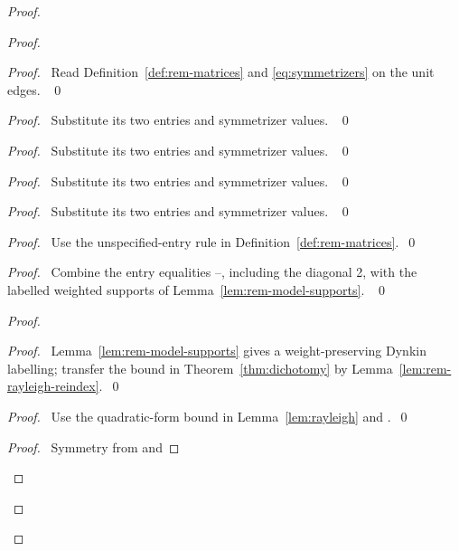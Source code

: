 \begin{proof}
\begin{proof}
\begin{proof}\pf\ Read Definition~\ref{def:rem-matrices} and
\eqref{eq:symmetrizers} on the unit edges. ~\qed\end{proof}
\begin{proof}\pf\ Substitute its two entries and symmetrizer values. ~\qed\end{proof}
\begin{proof}\pf\ Substitute its two entries and symmetrizer values. ~\qed\end{proof}
\begin{proof}\pf\ Substitute its two entries and symmetrizer values. ~\qed\end{proof}
\begin{proof}\pf\ Substitute its two entries and symmetrizer values. ~\qed\end{proof}
\begin{proof}\pf\ Use the unspecified-entry rule in
Definition~\ref{def:rem-matrices}.~\qed\end{proof}
\begin{proof}\pf\ Combine the entry equalities
--, including the diagonal 2,
with the labelled weighted supports of Lemma~\ref{lem:rem-model-supports}. ~\qed\end{proof}
\begin{proof}
\begin{proof}\pf\ Lemma~\ref{lem:rem-model-supports} gives a
weight-preserving Dynkin labelling; transfer the bound in
Theorem~\ref{thm:dichotomy} by Lemma~\ref{lem:rem-rayleigh-reindex}.~\qed\end{proof}
\begin{proof}\pf\ Use the quadratic-form bound in Lemma~\ref{lem:rayleigh}
and .~\qed\end{proof}
\qedstep
\begin{proof}\pf\ Symmetry from  and

\end{proof}
\end{proof}
\end{proof}
\end{proof}
